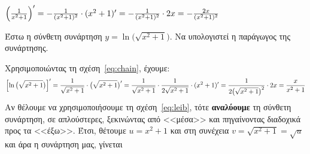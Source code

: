   \begin{example}
    $ \Bigl(\frac{1}{x^{2}+1} \Bigr)' = - \frac{1}{(x^{2}+1)^{2}} \cdot (x^{2}+1)' = 
    - \frac{1}{(x^{2}+1)^{2}} \cdot 2x = - \frac{2x}{(x^{2}+1)^{2}} $ 
  \end{example}
  \begin{exercise}
    Έστω η σύνθετη συνάρτηση $ y= \ln{\bigl(\sqrt{x^{2}+1}\bigr)} $. 
    Να υπολογιστεί η παράγωγος της συνάρτησης.  
  \end{exercise}
  \begin{solution}
    Χρησιμοποιώντας τη σχέση~\eqref{eq:chain}, έχουμε:
    \[
      \Bigl[\ln{\bigl(\sqrt{x^{2}+1}\bigr)} \Bigr]' = \frac{1}{\sqrt{x^{2}+1}} \cdot 
      \bigl(\sqrt{x^{2}+1} \bigr)' = \frac{1}{\sqrt{x^{2}+1}} \cdot 
      \frac{1}{2 \sqrt{x^{2}+1}} \cdot (x^{2}+1)' = \frac{1}{2 
      \bigl(\sqrt{x^{2}+1}\bigr)^{2}} \cdot 2x = \frac{x}{x^{2}+1}
    \]  
    Αν θέλουμε να χρησιμοποιήσουμε τη σχέση~\eqref{eq:leib}, τότε \textbf{αναλύουμε} 
    τη σύνθετη συνάρτηση, σε απλούστερες, ξεκινώντας από <<μέσα>> και πηγαίνοντας 
    διαδοχικά προς τα <<έξω>>. Έτσι, θέτουμε $ u=x^{2}+1 $ και στη συνέχεια
    $v= \sqrt{x^{2}+1} = \sqrt{u} $ και άρα η συνάρτηση μας, γίνεται

  \end{solution}
